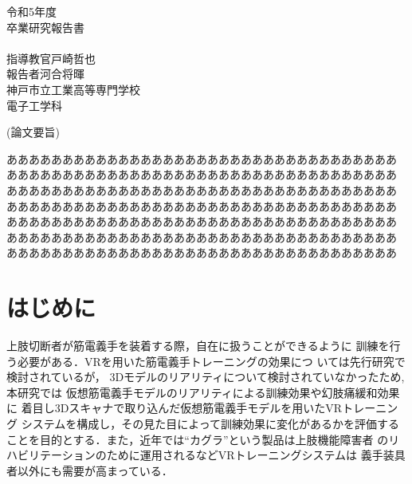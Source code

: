 \documentclass{ltjsreport}
\begin{document}
\begin{titlepage}
\begin{center}
\LARGE 令和5年度\\
\vspace{30pt}
\LARGE 卒業研究報告書\\
\vspace{50pt}
\huge{}\\
\vspace{80pt}
\Large 指導教官\hspace{10pt}戸崎哲也\\
\Large 報告者\hspace{23pt}河合将暉\\
\vspace{30pt}
\Large 神戸市立工業高等専門学校\\
\Large 電子工学科
\end{center}
\end{titlepage}
\restoregeometry
\clearpage

\begin{center}
\LARGE (論文要旨)
\end{center}
あああああああああああああああああああああああああああああああああああ
あああああああああああああああああああああああああああああああああああ
あああああああああああああああああああああああああああああああああああ
あああああああああああああああああああああああああああああああああああ
あああああああああああああああああああああああああああああああああああ
あああああああああああああああああああああああああああああああああああ
あああああああああああああああああああああああああああああああああああ
\clearpage

\setcounter{tocdepth}{3}
\tableofcontents
\setcounter{page}{1}

\chapter{はじめに}
	上肢切断者が筋電義手を装着する際，自在に扱うことができるように
	訓練を行う必要がある．VRを用いた筋電義手トレーニングの効果につ
	いては先行研究\cite{ref:1}\cite{ref:2}で検討されているが，
	3Dモデルのリアリティについて検討されていなかったため, 本研究では
	仮想筋電義手モデルのリアリティによる訓練効果や幻肢痛緩和効果に
	着目し3Dスキャナで取り込んだ仮想筋電義手モデルを用いたVRトレーニング
	システムを構成し，その見た目によって訓練効果に変化があるかを評価する
	ことを目的とする．また，近年では``カグラ''\cite{ref:6}という製品は上肢機能障害者
	のリハビリテーションのために運用されるなどVRトレーニングシステムは
	義手装具者以外にも需要が高まっている．
\end{document}
